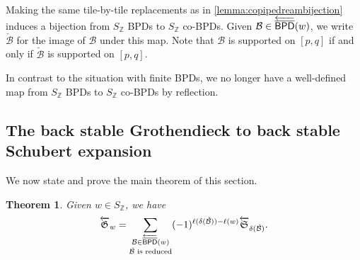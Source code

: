 \documentclass[12 pt]{amsart}
\newtheorem{theorem}[Theorem]{Theorem}
\numberwithin{equation}{section}
\theoremstyle{remark}
\newcommand{\kbpd}{\overline{\sf BPD}}
\newcommand{\demprod}{\delta}
\begin{document}
		
		Making the same tile-by-tile replacements as in \cref{lemma:copipedreambijection} induces a bijection from $S_{\mathbb{Z}}$ BPDs to $S_{\mathbb{Z}}$ co-BPDs. 
		Given $\mathcal{B}\in\overleftarrow{\kbpd}(w)$, we write $\check{\mathcal{B}}$ for the image of $\mathcal{B}$ under this map. 
		Note that $\mathcal{B}$ is supported on $[p,q]$ if and only if $\check{\mathcal{B}}$ is supported on $[p,q]$.
		
		In contrast to the situation with finite BPDs, we no longer have a well-defined map from $S_{\mathbb{Z}}$ BPDs to $S_{\mathbb{Z}}$ co-BPDs by reflection.

		\subsection{The back stable Grothendieck to back stable Schubert expansion}
		
		We now state and prove the main theorem of this section.
		
		\begin{theorem}
			\label{thm:backstable}
			Given $w \in S_{\mathbb{Z}}$, we have 
			\[\overleftarrow{\mathfrak{G}}_w = \sum_{\substack{\mathcal{B} \in \overleftarrow{\kbpd}(w)\\\check{\mathcal{B}} \text{ is reduced}}} (-1)^{\ell(\demprod(\check{\mathcal{B}}))-\ell(w)} \overleftarrow{\mathfrak{S}}_{\demprod(\check{\mathcal{B}})}.\]
		\end{theorem}
		
\end{document}
